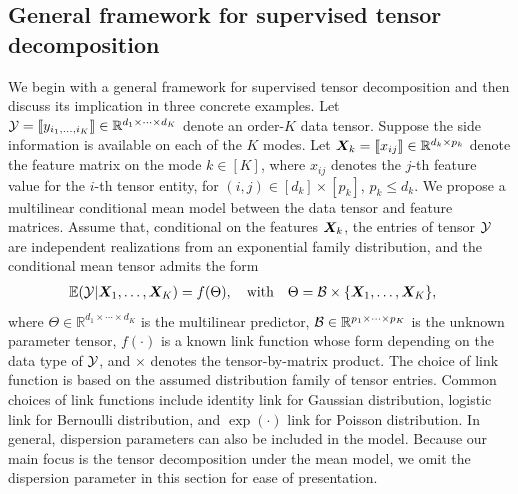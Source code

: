 \documentclass[12pt]{article}
\theoremstyle{definition}
\theoremstyle{definition}
\begin{document}
\subsection{General framework for supervised tensor decomposition}
We begin with a general framework for supervised tensor decomposition and then discuss its implication in three concrete examples. Let $\mathcal{Y}=\llbracket y_{i_1,\ldots,i_K} \rrbracket\in\mathbb{R}^{d_1\times \cdots\times d_K}$ denote an order-$K$ data tensor. Suppose the side information is available on each of the $K$ modes. Let $\bm X_k=\llbracket x_{ij} \rrbracket\in\mathbb{R}^{d_k\times p_k}$ denote the feature matrix on the mode $k\in[K]$, where $x_{ij}$ denotes the $j$-th feature value for the $i$-th tensor entity, for $(i,j)\in[d_k]\times[p_k]$, $p_k\leq d_k$. We propose a multilinear conditional mean model between the data tensor and feature matrices. Assume that, conditional on the features $\bm X_k$, the entries of tensor $\mathcal{Y}$ are independent realizations from an exponential family distribution, and the conditional mean tensor admits the form
\begin{align}\label{eq:tensormodel}
&\mathbb{E}(\mathcal{Y}|\bm X_1,\ldots,\bm X_K)=f(\Theta),\quad \text{with}\quad \Theta =\mathcal{B}\times\{\bm X_1,\ldots, \bm X_K\} ,
\end{align}
where $\Theta\in\mathbb{R}^{d_1\times \cdots\times d_K}$ is the multilinear predictor, $\mathcal{B}\in\mathbb{R}^{p_1\times \cdots \times p_K}$ is the unknown parameter tensor, $f(\cdot)$ is a known link function whose form depending on the data type of $\mathcal{Y}$, and $\times$ denotes the tensor-by-matrix product. The choice of link function is based on the assumed distribution family of tensor entries. Common choices of link functions include identity link for Gaussian distribution, logistic link for Bernoulli distribution, and $\exp(\cdot)$ link for Poisson distribution. In general, dispersion parameters can also be included in the model. Because our main focus is the tensor decomposition under the mean model, we omit the dispersion parameter in this section for ease of presentation. 
\end{document}
